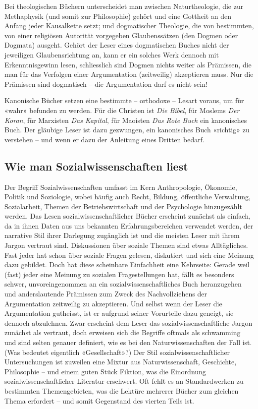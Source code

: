 \documentclass[a4paper,11pt]{scrartcl}
\begin{document}
Bei theologischen Büchern unterscheidet man zwischen Naturtheologie, die zur Methaphysik (und somit zur Philosophie) gehört und eine Gottheit an den Anfang jeder Kausalkette setzt; und dogmatischer Theologie, die von bestimmten, von einer religiösen Autorität vorgegeben Glaubenssätzen (den Dogmen oder Dogmata) ausgeht. Gehört der Leser eines dogmatischen Buches nicht der jeweiligen Glaubensrichtung an, kann er ein solches Werk dennoch mit Erkenntnisgewinn lesen, schliesslich sind Dogmen nichts weiter als Prämissen, die man für das Verfolgen einer Argumentation (zeitweilig) akzeptieren muss. Nur die Prämissen sind dogmatisch – die Argumentation darf es nicht sein!

Kanonische Bücher setzen eine bestimmte – orthodoxe – Lesart voraus, um für «wahr» befunden zu werden. Für die Christen ist \textit{Die Bibel}, für Moslems \textit{Der Koran}, für Marxisten \textit{Das Kapital}, für Maoisten \textit{Das Rote Buch} ein kanonisches Buch. Der gläubige Leser ist dazu gezwungen, ein kanonisches Buch «richtig» zu verstehen – und wenn er dazu der Anleitung eines Dritten bedarf.

\subsection{Wie man Sozialwissenschaften liest}

Der Begriff Sozialwissenschaften umfasst im Kern Anthropologie, Ökonomie, Politik und Soziologie, wobei häufig auch Recht, Bildung, öffentliche Verwaltung, Sozialarbeit, Themen der Betriebswirtschaft und der Psychologie hinzugezählt werden. Das Lesen sozialwissenschaftlicher Bücher erscheint zunächst als einfach, da in ihnen Daten aus uns bekannten Erfahrungsbereichen verwendet werden, der narrative Stil ihrer Darlegung zugänglich ist und die meisten Leser mit ihrem Jargon vertraut sind. Diskussionen über soziale Themen sind etwas Alltägliches. Fast jeder hat schon über soziale Fragen gelesen, diskutiert und sich eine Meinung dazu gebildet. Doch hat diese scheinbare Einfachheit eine Kehrseite: Gerade weil (fast) jeder eine Meinung zu sozialen Fragestellungen hat, fällt es besonders schwer, unvoreingenommen an ein sozialwissenschaftliches Buch heranzugehen und anderslautende Prämissen zum Zweck des Nachvollziehens der Argumentation zeitweilig zu akzeptieren. Und selbst wenn der Leser die Argumentation gutheisst, ist er aufgrund seiner Vorurteile dazu geneigt, sie dennoch abzulehnen. Zwar erscheint dem Leser das sozialwissenschaftliche Jargon zunächst als vertraut, doch erweisen sich die Begriffe oftmals als schwamming und sind selten genauer definiert, wie es bei den Naturwissenschaften der Fall ist. (Was bedeutet eigentlich «Gesellschaft»?) Der Stil sozialwissenschaftlicher Untersuchungen ist zuweilen eine Mixtur aus Naturwissenschaft, Geschichte, Philosophie – und einem guten Stück Fiktion, was die Einordnung sozialwissenschaftlicher Literatur erschwert. Oft fehlt es an Standardwerken zu bestimmten Themengebieten, was die Lektüre mehrerer Bücher zum gleichen Thema erfordert – und somit Gegenstand des vierten Teils ist.
\end{document}
